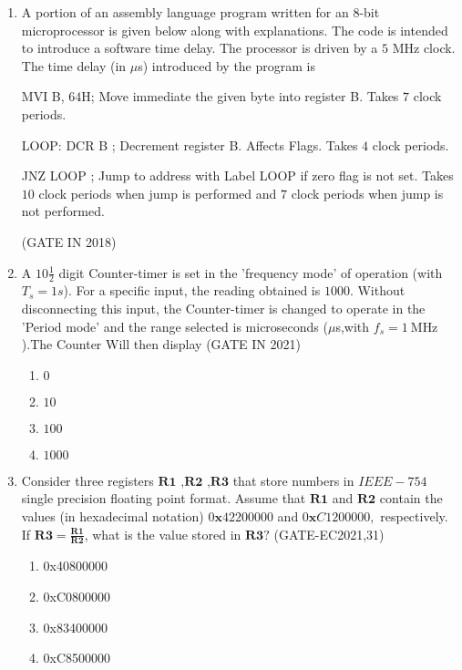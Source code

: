 
\begin{enumerate}

\item
\label{prob:gate IN 45}
 A portion of an assembly language program written for an $8$-bit microprocessor is given below along with explanations. The code is intended to introduce a software time delay. The processor is driven by a $5$ MHz clock. The time delay (in $\mu$s) introduced by the program is \vspace{12 pt}


MVI B, $64$H; Move immediate the given byte into register B. Takes $7$ clock periods.\vspace{12 pt}


LOOP: DCR B ; Decrement register B. Affects Flags. Takes $4$ clock periods. \vspace{12 pt}


JNZ LOOP ; Jump to address with Label LOOP if zero flag is not set. Takes $10$ clock periods when jump is performed and $7$ clock periods when jump is not performed.

\hfill(GATE IN 2018)

\item A $10\frac{1}{2}$ digit Counter-timer is set in the 'frequency mode' of operation (with $T_s=1s$). For a specific input, the reading obtained is $1000$. Without disconnecting this input, the Counter-timer is changed to operate in the 'Period mode' and the range selected is microseconds ($\mu$s,with $f_s=\SI{1}{\mega\hertz}$).The Counter Will then display
\hfill(GATE IN 2021)
\begin{enumerate}
  \item $0$
  \item $10$
  \item $100$
  \item $1000$
\end{enumerate}

\item Consider three registers $\textbf{R1 ,R2 ,R3}$ that store numbers in $ IEEE-754 $ single precision floating point format. Assume that $\textbf{R1}$ and $\textbf{R2}$ contain the values (in hexadecimal notation) $0\textbf{x}42200000$ and $0\textbf{x}C1200000,$ respectively. If $ \textbf{R3}=\frac{\textbf{R1}}{\textbf{R2}} $, what is the value stored in $\textbf{R3}?$
\hfill(GATE-EC2021,31)
\begin{enumerate}
    \item 0x40800000
    \item 0xC0800000
    \item 0x83400000
    \item 0xC8500000
\end{enumerate}

\end{enumerate}
